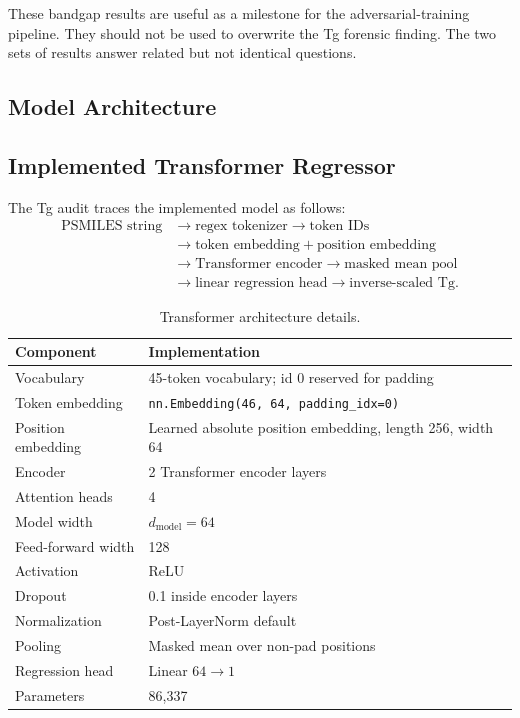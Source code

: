 \documentclass[11pt]{article}
\begin{document}
These bandgap results are useful as a milestone for the adversarial-training
pipeline. They should not be used to overwrite the Tg forensic finding. The two
sets of results answer related but not identical questions.

\subsection{Model Architecture}

\subsection{Implemented Transformer Regressor}

The Tg audit traces the implemented model as follows:
\begin{align*}
\text{PSMILES string}
&\rightarrow \text{regex tokenizer}
\rightarrow \text{token IDs}\\
&\rightarrow \text{token embedding} + \text{position embedding}\\
&\rightarrow \text{Transformer encoder}
\rightarrow \text{masked mean pool}\\
&\rightarrow \text{linear regression head}
\rightarrow \text{inverse-scaled Tg}.
\end{align*}

\begin{table}[H]
\centering
\caption{Transformer architecture details.}
\begin{tabularx}{\textwidth}{@{}lX@{}}
\toprule
Component & Implementation \\
\midrule
Vocabulary & 45-token vocabulary; id 0 reserved for padding \\
Token embedding & \texttt{nn.Embedding(46, 64, padding\_idx=0)} \\
Position embedding & Learned absolute position embedding, length 256, width 64 \\
Encoder & 2 Transformer encoder layers \\
Attention heads & 4 \\
Model width & $d_{\text{model}}=64$ \\
Feed-forward width & 128 \\
Activation & ReLU \\
Dropout & 0.1 inside encoder layers \\
Normalization & Post-LayerNorm default \\
Pooling & Masked mean over non-pad positions \\
Regression head & Linear $64 \rightarrow 1$ \\
Parameters & 86,337 \\
\bottomrule
\end{tabularx}
\end{table}
\end{document}

